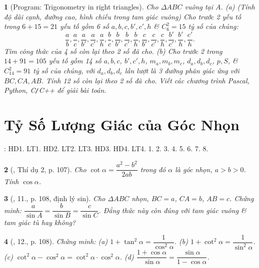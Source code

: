 \documentclass{article}
\newtheorem{baitoan}{}
\begin{document}
\begin{baitoan}[{\sf Program}: Trigonometry in right triangles]
	Cho $\Delta ABC$ vuông tại $A$. (a) {\rm(Tính độ dài cạnh, đường cao, hình chiếu trong tam giác vuông)} Cho trước 2 yếu tố trong $6 + 15 = 21$ yếu tố gồm 6 số $a,b,c,b',c',h$ \& $C_6^2 = 15$ tỷ số của chúng:
	\begin{equation*}
		\frac{a}{b},\frac{a}{c},\frac{a}{b'},\frac{a}{c'},\frac{a}{h},\frac{b}{c},\frac{b}{b'},\frac{b}{c'},\frac{b}{h},\frac{c}{b'},\frac{c}{c'},\frac{c}{h},\frac{b'}{c'},\frac{b'}{h},\frac{c'}{h}.
	\end{equation*}
	Tìm công thức của 4 số còn lại theo 2 số đã cho. (b) Cho trước 2 trong $14 + 91 = 105$ yếu tố gồm 14 số $a,b,c$, $b',c',h$, $m_a,m_b,m_c$, $d_a,d_b,d_c$, $p,S$, \& $C_{14}^2 = 91$ tỷ số của chúng, với $d_a,d_b,d_c$ lần lượt là 3 đường phân giác ứng với $BC,CA,AB$. Tính 12 số còn lại theo 2 số đã cho. Viết các chương trình {\sf Pascal, Python, C{\tt/}C++} để giải bài toán.
\end{baitoan}


\section{Tỷ Số Lượng Giác của Góc Nhọn}
\cite[Chap. IV, \S1, pp. 74--81]{SGK_Toan_9_Canh_Dieu_tap_1}: HD1. LT1. HD2. LT2. LT3. HD3. HD4. LT4. 1. 2. 3. 4. 5. 6. 7. 8.

\begin{baitoan}[\cite{Tuyen_Toan_9_old}, Thí dụ 2, p. 107]
	Cho $\cot\alpha = \dfrac{a^2 - b^2}{2ab}$ trong đó $\alpha$ là góc nhọn, $a > b > 0$. Tính $\cos\alpha$.
\end{baitoan}

\begin{baitoan}[\cite{Tuyen_Toan_9_old}, 11., p. 108, định lý sin]
	Cho $\Delta ABC$ nhọn, $BC = a$, $CA = b$, $AB = c$. Chứng minh: $\dfrac{a}{\sin A} = \dfrac{b}{\sin B} = \dfrac{c}{\sin C}$. Đẳng thức này còn đúng với tam giác vuông \& tam giác tù hay không?
\end{baitoan}

\begin{baitoan}[\cite{Tuyen_Toan_9_old}, 12., p. 108]
	Chứng minh: (a) $1 + \tan^2\alpha = \dfrac{1}{\cos^2\alpha}$. (b) $1 + \cot^2\alpha = \dfrac{1}{\sin^2\alpha}$. (c) $\cot^2\alpha - \cos^2\alpha = \cot^2\alpha\cdot\cos^2\alpha$. (d) $\dfrac{1 + \cos\alpha}{\sin\alpha} = \dfrac{\sin\alpha}{1 - \cos\alpha}$.
\end{baitoan}
\end{document}
